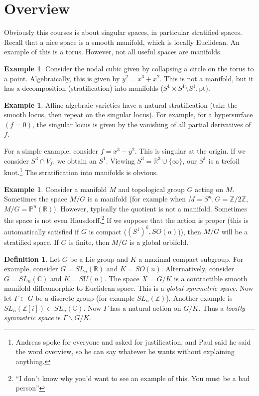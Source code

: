 \documentclass[leqno, openany]{memoir}
\theoremstyle{definition}
\newtheorem{defn}[thm]{Definition}
\newtheorem{exm}[thm]{Example}
\theoremstyle{remark}
\theoremstyle{plain}
\theoremstyle{definition}
\theoremstyle{remark}
\newcommand{\R}{\mathbb{R}}
\newcommand{\C}{\mathbb{C}}
\newcommand{\Z}{\mathbb{Z}}
\renewcommand{\P}{\mathbb{P}}
\newcommand{\mr}[1]{\mathrm{#1}}
\begin{document}
\section{Overview}
\label{sec:overview}

Obviously this courses is about singular spaces, in particular stratified spaces. Recall that a nice space is a smooth manifold, which is locally Euclidean. An example of this is a torus. However, not all useful spaces are manifolds.

\begin{exm}
    Consider the nodal cubic given by collapsing a circle on the torus to a point. Algebraically, this is given by $y^2=x^3+x^2$. This is not a manifold, but it has a decomposition (stratification) into manifolds ($S^1 \times S^1 \setminus S^1, \mr{pt}$).
\end{exm}%

\begin{exm}
    Affine algebraic varieties have a natural stratification (take the smooth locus, then repeat on the singular locus). For example, for a hypersurface $(f=0)$, the singular locus is given by the vanishing of all partial derivatives of $f$.

    For a simple example, consider $f=x^3-y^2$. This is singular at the origin. If we consider $S^3 \cap V_f$, we obtain an $S^1$. Viewing $S^3 = \R^3 \cup \{ \infty\}$, our $S^1$ is a trefoil knot.\footnote{Andreas spoke for everyone and asked for justification, and Paul said he said the word overview, so he can say whatever he wants without explaining anything.} The stratification into manifolds is obvious.
\end{exm}

\begin{exm}
    Consider a manifold $M$ and topological group $G$ acting on $M$. Sometimes the space $M/G$ is a manifold (for example when $M = S^n, G = \Z/2\Z$, $M/G = \P^n(\R)$). However, typically the quotient is not a manifold. Sometimes the space is not even Hausdorff.\footnote{``I don't know why you'd want to see an example of this. You must be a bad person''} If we suppose that the action is proper (this is automatically satisfied if $G$ is compact ($(S^1)^k, SO(n)$)), then $M/G$ will be a stratified space. If $G$ is finite, then $M/G$ is a global orbifold.
\end{exm}

\begin{defn}
    Let $G$ be a Lie group and $K$ a maximal compact subgroup. For example, consider $G = SL_n(\R)$ and $K = SO(n)$. Alternatively, consider $G = SL_n(\C)$ and $K = SU(n)$. The space $X = G/K$ is a contractible smooth manifold diffeomorphic to Euclidean space. This is a \textit{global symmetric space}. Now let $\Gamma \subset G$ be a discrete group (for example $SL_n(\Z)$). Another example is $SL_n(\Z[i]) \subset SL_n(\C)$. Now $\Gamma$ has a natural action on $G/K$. Thus a \textit{locally symmetric space} is $\Gamma \backslash G/K$.
\end{defn}
\end{document}
